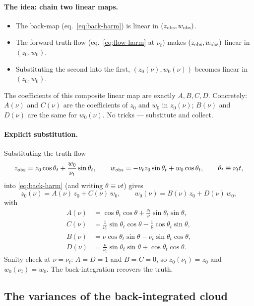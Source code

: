 \documentclass[11pt]{article}
\begin{document}
\paragraph{The idea: chain two linear maps.}
\begin{itemize}
\item The back-map (eq.~\eqref{eq:back-harm}) is linear in $(z_{\rm obs},w_{\rm obs})$.
\item The forward truth-flow (eq.~\eqref{eq:flow-harm} at $\nu_t$) makes
$(z_{\rm obs},w_{\rm obs})$ linear in $(z_0,w_0)$.
\item Substituting the second into the first, $(z_0(\nu),w_0(\nu))$ becomes linear in
$(z_0,w_0)$.
\end{itemize}
The coefficients of this composite linear map are exactly $A,B,C,D$. Concretely:
$A(\nu)$ and $C(\nu)$ are the coefficients of $z_0$ and $w_0$ in $z_0(\nu)$;
$B(\nu)$ and $D(\nu)$ are the same for $w_0(\nu)$. No tricks — substitute and collect.

\paragraph{Explicit substitution.}
Substituting the truth flow
\begin{equation}
z_{\rm obs} = z_0\cos\theta_t + \frac{w_0}{\nu_t}\sin\theta_t,
\qquad
w_{\rm obs} = -\nu_t z_0\sin\theta_t + w_0\cos\theta_t,
\qquad \theta_t\equiv\nu_t t,
\end{equation}
into \eqref{eq:back-harm} (and writing $\theta\equiv\nu t$) gives
\begin{equation}
z_0(\nu) = A(\nu)\,z_0 + C(\nu)\,w_0,
\qquad
w_0(\nu) = B(\nu)\,z_0 + D(\nu)\,w_0,
\label{eq:zw-back-decomp}
\end{equation}
with
\begin{align}
A(\nu) &= \cos\theta_t\cos\theta + \tfrac{\nu_t}{\nu}\sin\theta_t\sin\theta,\\[2pt]
C(\nu) &= \tfrac{1}{\nu_t}\sin\theta_t\cos\theta - \tfrac{1}{\nu}\cos\theta_t\sin\theta,\\[2pt]
B(\nu) &= \nu\cos\theta_t\sin\theta - \nu_t\sin\theta_t\cos\theta,\\[2pt]
D(\nu) &= \tfrac{\nu}{\nu_t}\sin\theta_t\sin\theta + \cos\theta_t\cos\theta.
\end{align}
Sanity check at $\nu=\nu_t$: $A=D=1$ and $B=C=0$, so $z_0(\nu_t)=z_0$ and $w_0(\nu_t)=w_0$.
The back-integration recovers the truth.

\subsection{The variances of the back-integrated cloud}
\end{document}

